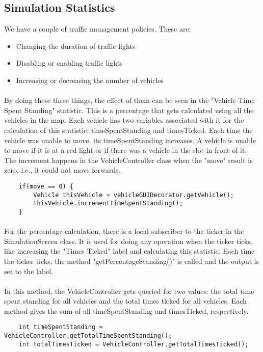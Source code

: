 \documentclass[a4paper,11pt,titlepage]{article}
\begin{document}
\subsection{Simulation Statistics}
We have a couple of traffic management policies. These are:
\begin{itemize}\itemsep1pt \parskip0pt 
\item Changing the duration of traffic lights
\item Disabling or enabling traffic lights
\item Increasing or decreasing the number of vehicles
\end{itemize}
\paragraph{}
By doing these three things, the effect of them can be seen in the "Vehicle Time Spent Standing" statistic. This is a percentage that gets calculated using all the vehicles in the map. Each vehicle has two variables associated with it for the calculation of this statistic: timeSpentStanding and timesTicked. Each time the vehicle was unable to move, its timeSpentStanding increases. A vehicle is unable to move if it is at a red light or if there was a vehicle in the slot in front of it. The increment happens in the  VehicleController class when the "move" result is zero, i.e., it could not move forwards.
\begin{lstlisting}
	if(move == 0) {
		Vehicle thisVehicle = vehicleGUIDecorator.getVehicle();
		thisVehicle.incrementTimeSpentStanding();
	}
\end{lstlisting}
\paragraph{}
For the percentage calculation, there is a local subscriber to the ticker in the SimulationScreen class. It is used for doing any operation when the ticker ticks, like increasing the "Times Ticked" label and calculating this statistic. Each time the ticker ticks, the method "getPercentageStanding()" is called and the output is set to the label.
\paragraph{}
In this method, the VehicleController gets queried for two values: the total time spent standing for all vehicles and the total times ticked for all vehicles. Each method gives the sum of all timeSpentStanding and timesTicked, respectively. 
\begin{lstlisting}
	int timeSpentStanding = VehicleController.getTotalTimeSpentStanding();
	int totalTimesTicked = VehicleController.getTotalTimesTicked();
\end{lstlisting}
\end{document}
